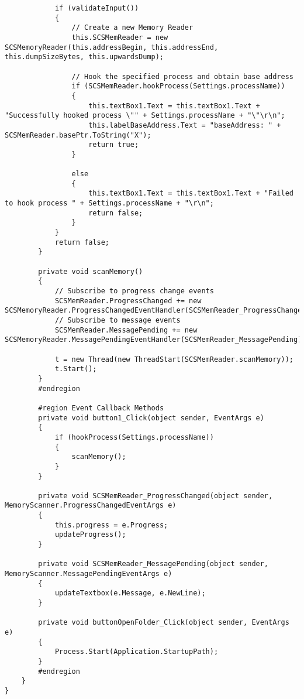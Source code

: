 \begin{lstlisting}
            if (validateInput())
            {
                // Create a new Memory Reader
                this.SCSMemReader = new SCSMemoryReader(this.addressBegin, this.addressEnd, this.dumpSizeBytes, this.upwardsDump);

                // Hook the specified process and obtain base address
                if (SCSMemReader.hookProcess(Settings.processName))
                {
                    this.textBox1.Text = this.textBox1.Text + "Successfully hooked process \"" + Settings.processName + "\"\r\n";
                    this.labelBaseAddress.Text = "baseAddress: " + SCSMemReader.basePtr.ToString("X");
                    return true;
                }

                else
                {
                    this.textBox1.Text = this.textBox1.Text + "Failed to hook process " + Settings.processName + "\r\n";
                    return false;
                }
            }
            return false;
        }

        private void scanMemory()
        {
            // Subscribe to progress change events
            SCSMemReader.ProgressChanged += new SCSMemoryReader.ProgressChangedEventHandler(SCSMemReader_ProgressChanged);
            // Subscribe to message events
            SCSMemReader.MessagePending += new SCSMemoryReader.MessagePendingEventHandler(SCSMemReader_MessagePending);

            t = new Thread(new ThreadStart(SCSMemReader.scanMemory));
            t.Start();
        }
        #endregion

        #region Event Callback Methods
        private void button1_Click(object sender, EventArgs e)
        {
            if (hookProcess(Settings.processName))
            {
                scanMemory();
            }
        }

        private void SCSMemReader_ProgressChanged(object sender, MemoryScanner.ProgressChangedEventArgs e)
        {
            this.progress = e.Progress;
            updateProgress();
        }

        private void SCSMemReader_MessagePending(object sender, MemoryScanner.MessagePendingEventArgs e)
        {
            updateTextbox(e.Message, e.NewLine);
        }

        private void buttonOpenFolder_Click(object sender, EventArgs e)
        {
            Process.Start(Application.StartupPath);
        }
        #endregion
    }
}

\end{lstlisting}

